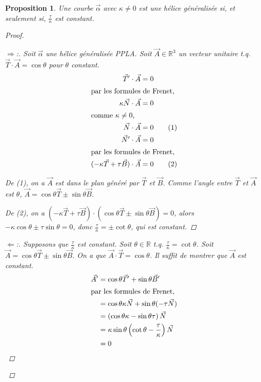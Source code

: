 \documentclass{report}
\newtheorem*{prop}{Proposition}
\theoremstyle{definition}
\theoremstyle{remark}
\newenvironment*{subproof}[1][D\'emonstration]
{
\begin{proof}[#1]

}
{
\renewcommand{\qedsymbol}{$\blacksquare$}
\end{proof}
\renewcommand{\qedsymbol}{$\square$}
}
\def\RR{\mathbb{R}}
\begin{document}
	\begin{prop}
		Une courbe $\vec\alpha$ avec $\kappa\neq0$ est une h\'elice g\'en\'eralis\'ee si, et seulement si, $\frac{\tau}{\kappa}$ est constant.
		\begin{proof}
			\begin{subproof}[$\Rightarrow$:]
				Soit $\vec\alpha$ une h\'elice g\'en\'eralis\'ee PPLA. Soit $\vec A\in\RR^3$ un vecteur unitaire t.q. $\vec T \cdot \vec A=\cos\theta$ pour $\theta$ constant.
				\begin{align*}
					\vec T' \cdot \vec A&= 0\\
					\shortintertext{par les formules de Frenet,}
					\kappa\vec N \cdot \vec A&= 0\\
					\shortintertext{comme $\kappa\neq0$,}
					\vec N \cdot \vec A&= 0\tag{1}\\
					\vec N' \cdot \vec A&= 0\\
					\shortintertext{par les formules de Frenet,}
					(-\kappa\vec T+\tau\vec B) \cdot \vec A&= 0\tag{2}
				\end{align*}

				De (1), on a $\vec A$ est dans le plan g\'en\'er\'e par $\vec T$ et $\vec B$. Comme l'angle entre $\vec T$ et $\vec A$ est $\theta$, $\vec A = \cos\theta\vec T \pm \sin\theta\vec B$.

				De (2), on a $(-\kappa\vec T+\tau\vec B) \cdot (\cos\theta\vec T \pm \sin\theta\vec B)=0$, alors $-\kappa\cos\theta\pm\tau\sin\theta=0$, donc $\frac{\tau}{\kappa}=\pm\cot\theta$, qui est constant.
			\end{subproof}
			\begin{subproof}[$\Leftarrow$:]
				Supposons que $\frac{\tau}{\kappa}$ est constant. Soit $\theta\in\RR$ t.q. $\frac{\tau}{\kappa}=\cot\theta$. Soit $\vec A=\cos\theta\vec T\pm\sin\theta\vec B$. On a que $\vec A \cdot \vec T=\cos\theta$. Il suffit de montrer que $\vec A$ est constant.
				\begin{align*}
					\vec A'&= \cos\theta\vec T' + \sin\theta\vec B'\\
					\shortintertext{par les formules de Frenet,}
					&= \cos\theta\kappa\vec N + \sin\theta(-\tau\vec N)\\
					&= \left( \cos\theta\kappa-\sin\theta\tau \right) \vec N\\
					&= \kappa\sin\theta \left( \cot\theta-\frac{\tau}{\kappa} \right) \vec N\\
					&= 0
				\end{align*}
			\end{subproof}
		\end{proof}
	\end{prop}
\end{document}
